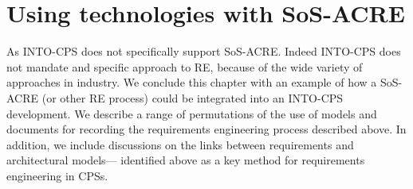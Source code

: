 \section{Using technologies with SoS-ACRE}


As INTO-CPS does not specifically support SoS-ACRE. Indeed INTO-CPS does not mandate and specific approach to RE, because of the wide variety of approaches in industry. We conclude this chapter with an example of how a SoS-ACRE (or other RE process) could be integrated into an INTO-CPS development. We describe a range of permutations of the use of models and documents for recording the requirements engineering process described above. In addition, we include discussions on the links between requirements and architectural models--- identified above as a key method for requirements engineering in CPSs. %

